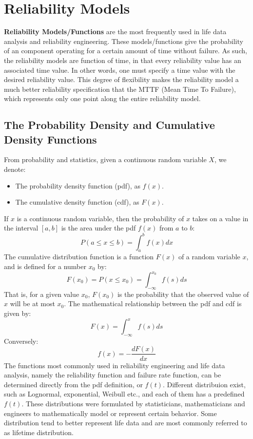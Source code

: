 \section{Reliability Models}
\label{sec:ReliabilityModels}

\textbf{Reliability Models/Functions} are the most frequently used in life data analysis
and reliability engineering. These models/functions give the probability of an component
operating for a certain amount of time without failure. As such, the reliability models
are function of time, in that every reliability value has an associated time value. In
other words, one must specify a time value with the desired reliability value. This degree
of flexibility makes the reliability model a much better reliability specification that the
MTTF (Mean Time To Failure), which represents only one point along the entire reliability
model.

\subsection{The Probability Density and Cumulative Density Functions}
From probability and statistics, given a continuous random variable $X$, we denote:
\begin{itemize}
	\item The probability density function (pdf), as $f(x)$.
	\item The cumulative density function (cdf), as $F(x)$.
\end{itemize}
If $x$ is a continuous random variable, then the probability of $x$ takes on a value in the
interval $[a,b]$ is the area under the pdf $f(x)$ from $a$ to $b$:
\begin{equation}
  P(a\leq x\leq b) = \int_{a}^{b} f(x)dx
\end{equation}
The cumulative distribution function is a function $F(x)$ of a random variable $x$, and is
defined for a number $x_0$ by:
\begin{equation}
  F(x_0) = P(x\leq x_0) = \int_{-\infty}^{x_0} f(s)ds
\end{equation}
That is, for a given value $x_0$, $F(x_0)$ is the probability that the observed value of $x$
will be at most $x_0$. The mathematical relationship between the pdf and cdf is given by:
\begin{equation}
  F(x) = \int_{-\infty}^{x} f(s)ds
\end{equation}
Conversely:
\begin{equation}
  f(x) = - \frac{dF(x)}{dx}
\end{equation}
The functions most commonly used in reliability engineering and life data analysis, namely the
reliability function and failure rate function, can be determined directly from the pdf definition,
or $f(t)$. Different distribuion exist, such as Lognormal, exponential, Weibull etc., and each of
them has a predefined $f(t)$. These distributions were formulated by statisticians, mathematicians
and engineers to mathematically model or represent certain behavior. Some distribution tend to better
represent life data and are most commonly referred to as lifetime distribution.

